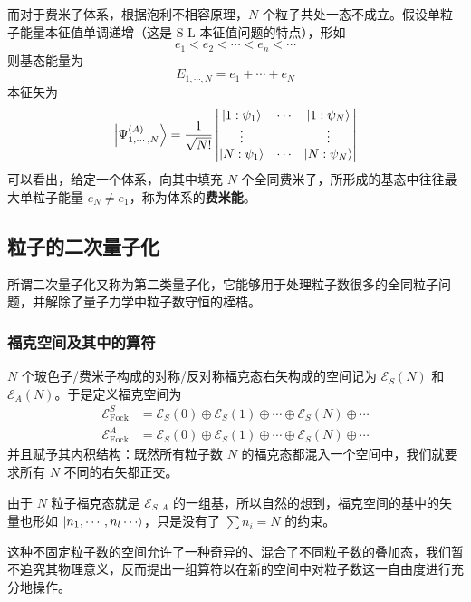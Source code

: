 \documentclass[cn,10pt,math=newtx,citestyle=gb7714-2015,bibstyle=gb7714-2015]{elegantbook}
\def\ms{\mathscr}
\begin{document}
而对于费米子体系，根据泡利不相容原理，$N$ 个粒子共处一态不成立。假设单粒子能量本征值单调递增（这是 S-L 本征值问题的特点），形如
\begin{equation}
    e_1<e_2<\cdots<e_{n}<\cdots
\end{equation}
则基态能量为
\begin{equation}
    E_{1,\cdots,N} = e_1+\cdots+e_N
\end{equation}
本征矢为
\begin{equation}
    \Ket{\Psi_{1,\cdots,N}^{(A)}} = \frac 1{\sqrt{N!}}\begin{vmatrix}\ket{1:\psi_1} & \cdots & \ket{1:\psi_N}\\\vdots & & \vdots \\ \ket{N:\psi_1} & \cdots & \ket{N:\psi_N}\end{vmatrix}
\end{equation}
可以看出，给定一个体系，向其中填充 $N$ 个全同费米子，所形成的基态中往往最大单粒子能量 $e_N\ne e_1$，称为体系的\textbf{费米能}。

\subsection{粒子的二次量子化}

所谓二次量子化又称为第二类量子化，它能够用于处理粒子数很多的全同粒子问题，并解除了量子力学中粒子数守恒的桎梏。

\subsubsection{福克空间及其中的算符}
\begin{definition}[福克空间]
    $N$ 个玻色子/费米子构成的对称/反对称福克态右矢构成的空间记为 $\ms E_S(N)$ 和 $\ms E_A(N)$。于是定义福克空间为
    \begin{align}
        \ms E_\text{Fock}^S &= \ms E_S(0)\oplus\ms E_S(1)\oplus\cdots\oplus\ms E_S(N)\oplus\cdots\\
        \ms E_\text{Fock}^A &= \ms E_S(0)\oplus\ms E_S(1)\oplus\cdots\oplus\ms E_S(N)\oplus\cdots
    \end{align}
    并且赋予其内积结构：既然所有粒子数 $N$ 的福克态都混入一个空间中，我们就要求所有 $N$ 不同的右矢都正交。
\end{definition}

由于 $N$ 粒子福克态就是 $\ms E_{S,A}$ 的一组基，所以自然的想到，福克空间的基中的矢量也形如 $\ket{n_1,\cdots,n_l\cdots}$，只是没有了 $\sum n_i=N$ 的约束。

这种不固定粒子数的空间允许了一种奇异的、混合了不同粒子数的叠加态，我们暂不追究其物理意义，反而提出一组算符以在新的空间中对粒子数这一自由度进行充分地操作。
\end{document}
